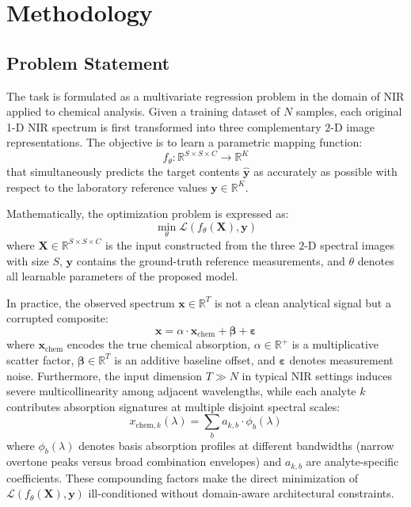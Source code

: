 \documentclass[pdflatex,sn-mathphys-num]{sn-jnl}%
\begin{document}
\section{Methodology}
\subsection{Problem Statement}\label{sec:problem-statement}

The task is formulated as a multivariate regression problem in the domain of NIR applied to chemical analysis. Given a training dataset of $N$ samples, each original 1-D NIR spectrum is first transformed into three complementary $2$-D image representations. The objective is to learn a parametric mapping function:
\begin{equation}
    f_\theta : \mathbb{R}^{S\times S\times C} \rightarrow \mathbb{R}^{K}
\end{equation}
that simultaneously predicts the target contents $\hat{\textbf{y}}$ as accurately as possible with respect to the laboratory reference values $\textbf{y} \in \mathbb{R}^K$.

Mathematically, the optimization problem is expressed as:
\begin{equation}
    \min_\theta \mathcal{L}\left( f_\theta \left( \textbf{X}\right), \textbf{y}\right)
\end{equation}
where $\textbf{X} \in \mathbb{R}^{S\times S\times C}$ is the input constructed from the three $2$-D spectral images with size $S$, $\textbf{y}$ contains the ground-truth reference measurements, and $\theta$ denotes all learnable parameters of the proposed model.

In practice, the observed spectrum $\mathbf{x} \in 
\mathbb{R}^T$ is not a clean analytical signal but a 
corrupted composite:
\begin{equation}
    \mathbf{x} = \alpha \cdot \mathbf{x}_{\text{chem}} 
    + \boldsymbol{\beta} + \boldsymbol{\varepsilon}
\end{equation}
where $\mathbf{x}_{\text{chem}}$ encodes the true 
chemical absorption, $\alpha \in \mathbb{R}^+$ is a 
multiplicative scatter factor, $\boldsymbol{\beta} \in 
\mathbb{R}^T$ is an additive baseline offset, and 
$\boldsymbol{\varepsilon}$ denotes measurement noise. 
Furthermore, the input dimension $T \gg N$ in typical 
NIR settings induces severe multicollinearity among 
adjacent wavelengths, while each analyte $k$ contributes 
absorption signatures at multiple disjoint spectral 
scales:
\begin{equation}
    x_{\text{chem},k}(\lambda) = 
    \sum_{b} a_{k,b} \cdot \phi_b(\lambda)
\end{equation}
where $\phi_b(\lambda)$ denotes basis absorption profiles 
at different bandwidths (narrow overtone peaks versus 
broad combination envelopes) and $a_{k,b}$ are 
analyte-specific coefficients. These compounding factors 
make the direct minimization of 
$\mathcal{L}(f_\theta(\mathbf{X}), \mathbf{y})$ 
ill-conditioned without domain-aware architectural 
constraints.
\end{document}
